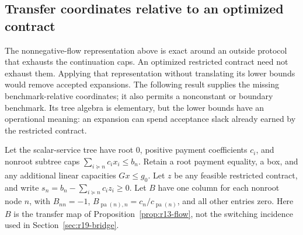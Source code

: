 \subsection{Transfer coordinates relative to an optimized contract}\label{sec:r24-transfers}
The nonnegative-flow representation above is exact around an outside protocol
that exhausts the continuation caps. An optimized restricted contract need not
exhaust them. Applying that representation without translating its lower bounds
would remove accepted expansions. The following result supplies the missing
benchmark-relative coordinates; it also permits a nonconstant or boundary
benchmark. Its tree algebra is elementary, but the lower bounds have an
operational meaning: an expansion can spend acceptance slack already earned by
the restricted contract.

Let the scalar-service tree have root $0$, positive payment coefficients $c_i$,
and nonroot subtree caps $\sum_{i\succeq n}c_i x_i\leq b_n$.
Retain a root payment equality, a box, and any additional linear capacities
$Gx\leq g_0$. Let $z$ be any feasible restricted contract, and write
$s_n=b_n-\sum_{i\succeq n}c_i z_i\geq0$.
Let $B$ have one column for each nonroot node $n$, with
$B_{nn}=-1$, $B_{\operatorname{pa}(n),n}=c_n/c_{\operatorname{pa}(n)}$,
and all other entries zero. Here $B$ is the transfer map of
Proposition~\ref{prop:r13-flow}, not the switching incidence used in
Section~\ref{sec:r19-bridge}.

